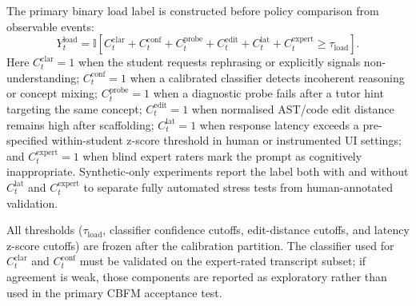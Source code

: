 \documentclass[11pt,a4paper]{report}
\begin{document}
The primary binary load label is constructed before policy comparison from observable events:
\begin{equation}
    Y^{\text{load}}_t
    =
    \mathbb{I}\left[
    C^{\text{clar}}_t
    + C^{\text{conf}}_t
    + C^{\text{probe}}_t
    + C^{\text{edit}}_t
    + C^{\text{lat}}_t
    + C^{\text{expert}}_t
    \ge \tau_{\text{load}}
    \right].
\end{equation}
Here $C^{\text{clar}}_t=1$ when the student requests rephrasing or explicitly signals non-understanding; $C^{\text{conf}}_t=1$ when a calibrated classifier detects incoherent reasoning or concept mixing; $C^{\text{probe}}_t=1$ when a diagnostic probe fails after a tutor hint targeting the same concept; $C^{\text{edit}}_t=1$ when normalised AST/code edit distance remains high after scaffolding; $C^{\text{lat}}_t=1$ when response latency exceeds a pre-specified within-student z-score threshold in human or instrumented UI settings; and $C^{\text{expert}}_t=1$ when blind expert raters mark the prompt as cognitively inappropriate. Synthetic-only experiments report the label both with and without $C^{\text{lat}}_t$ and $C^{\text{expert}}_t$ to separate fully automated stress tests from human-annotated validation.

All thresholds ($\tau_{\text{load}}$, classifier confidence cutoffs, edit-distance cutoffs, and latency z-score cutoffs) are frozen after the calibration partition. The classifier used for $C^{\text{clar}}_t$ and $C^{\text{conf}}_t$ must be validated on the expert-rated transcript subset; if agreement is weak, those components are reported as exploratory rather than used in the primary CBFM acceptance test.
\end{document}
